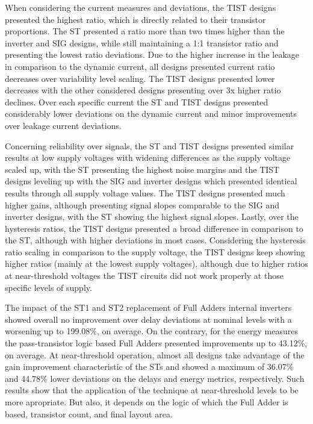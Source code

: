 \documentclass[pgmicro,diss,english]{iiufrgs}
\begin{document}
When considering the current measures and deviations, the TIST designs presented the highest ratio, which is directly related to their transistor proportions. The ST presented a ratio more than two times higher than the inverter and SIG designs, while still maintaining a 1:1 transistor ratio and presenting the lowest ratio deviations. Due to the higher increase in the leakage in comparison to the dynamic current, all designs presented current ratio decreases over variability level scaling. The TIST designs presented lower decreases with the other considered designs presenting over 3x higher ratio declines. Over each specific current the ST and TIST designs presented considerably lower deviations on the dynamic current and minor improvements over leakage current deviations.

Concerning reliability over signals, the ST and TIST designs presented similar results at low supply voltages with widening differences as the supply voltage scaled up, with the ST presenting the highest noise margins and the TIST designs leveling up with the SIG and inverter designs which presented identical results through all supply voltage values. The TIST designs presented much higher gains, although presenting signal slopes comparable to the SIG and inverter designs, with the ST showing the highest signal slopes. Lastly, over the hysteresis ratios, the TIST designs presented a broad difference in comparison to the ST, although with higher deviations in most cases. Considering the hysteresis ratio scaling in comparison to the supply voltage, the TIST designs keep showing higher ratios (mainly at the lowest supply voltages), although due to higher ratios at near-threshold voltages the TIST circuits did not work properly at those specific levels of supply.

The impact of the ST1 and ST2 replacement of Full Adders internal inverters showed overall no improvement over delay deviations at nominal levels with a worsening up to 199.08\%, on average. On the contrary, for the energy measures the pass-transistor logic based Full Adders presented improvements up to 43.12\%, on average. At near-threshold operation, almost all designs take advantage of the gain improvement characteristic of the STs and showed a maximum of 36.07\% and 44.78\% lower deviations on the delays and energy metrics, respectively. Such results show that the application of the technique at near-threshold levels to be more apropriate. But also, it depends on the logic of which the Full Adder is based, transistor count, and final layout area.
\end{document}
